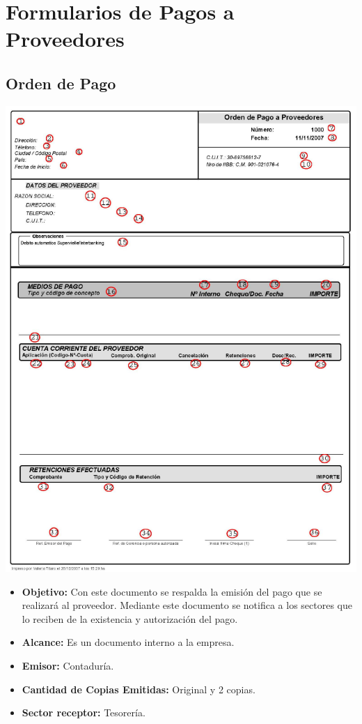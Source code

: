 \pagebreak
\section{Formularios de Pagos a Proveedores}
\subsection{Orden de Pago} 

\begin{center}
 \includegraphics[scale=0.8,keepaspectratio=true]{./Circuitos-Teoricos/Pago-a-Proveedores/Images/orden-de-pago.png}
\end{center}

\pagebreak
\begin{itemize}
  \item \textbf{Objetivo:} Con este documento se respalda la emisión del pago que se realizará al proveedor.
Mediante este documento se notifica a los sectores que lo reciben de la existencia y autorización
del pago.
  \item \textbf{Alcance:} Es un documento interno a la empresa.
  \item \textbf{Emisor:} Contaduría.
  \item \textbf{Cantidad de Copias Emitidas:} Original y 2 copias.
  \item \textbf{Sector receptor:} Tesorería.
\end{itemize}

